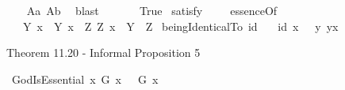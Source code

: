 \begin{isabellebody}
%
\isadelimproof
\ \ %
\endisadelimproof
%
\isatagproof
{}\isamarkupfalse%
\ A{}a\ A{}b\ \isamarkupfalse%
\ blast\ %
%
\endisatagproof
{\isafoldproof}%
%
\isadelimproof
\isanewline
%
\endisadelimproof
\ \ \ \ \isanewline
{}\isamarkupfalse%
\ True\ \isamarkupfalse%
{\isacharbrackleft}satisfy{\isacharbrackright}%
\isadelimproof
\ %
\endisadelimproof
%
\isatagproof
{}\isamarkupfalse%
\ %
%
\endisatagproof
{\isafoldproof}%
%
\isadelimproof
%
\endisadelimproof
%
\isamarkuptrue%
\isamarkupfalse%
\ essenceOf{\isacharcolon}{\isacharcolon}{\isachardoublequoteopen}{\isasymup}{\isasymlangle}{\isasymup}{\isasymlangle}{\isasymzero}{\isasymrangle}{\isacharcomma}{\isasymzero}{\isasymrangle}{\isachardoublequoteclose}\ {\isacharparenleft}{\isachardoublequoteopen}{\isasymE}{\isachardoublequoteclose}{\isacharparenright}\ \isanewline
\ \ {\isachardoublequoteopen}{\isasymE}\ Y\ x\ {\isasymequiv}\ {\isacharparenleft}Y\ x{\isacharparenright}\ \isactrlbold {\isasymand}\ {\isacharparenleft}\isactrlbold {\isasymforall}Z{\isachardot}\ Z\ x\ \isactrlbold {\isasymrightarrow}\ Y\ {\isasymRrightarrow}\ Z{\isacharparenright}{\isachardoublequoteclose}\isanewline
{}\isamarkupfalse%
\ beingIdenticalTo{\isacharcolon}{\isacharcolon}{\isachardoublequoteopen}{\isasymzero}{\isasymRightarrow}{\isasymup}{\isasymlangle}{\isasymzero}{\isasymrangle}{\isachardoublequoteclose}\ {\isacharparenleft}{\isachardoublequoteopen}id{\isachardoublequoteclose}{\isacharparenright}\ \isanewline
\ \ {\isachardoublequoteopen}id\ x\ \ {\isasymequiv}\ {\isacharparenleft}{\isasymlambda}y{\isachardot}\ y\isactrlbold {\isasymapprox}x{\isacharparenright}{\isachardoublequoteclose}\ \ %
%
\begin{isamarkuptext}%
Theorem 11.20 - Informal Proposition 5%
\end{isamarkuptext}\isamarkuptrue%
\isamarkupfalse%
\ GodIsEssential{\isacharcolon}\ {\isachardoublequoteopen}{\isasymlfloor}\isactrlbold {\isasymforall}x{\isachardot}\ G\ x\ \isactrlbold {\isasymrightarrow}\ {\isacharparenleft}{\isasymE}\ G\ x{\isacharparenright}{\isasymrfloor}{\isachardoublequoteclose}%
\isadelimproof
\ %
\endisadelimproof
%
\isatagproof
{}\isamarkupfalse%

\end{isabellebody}
